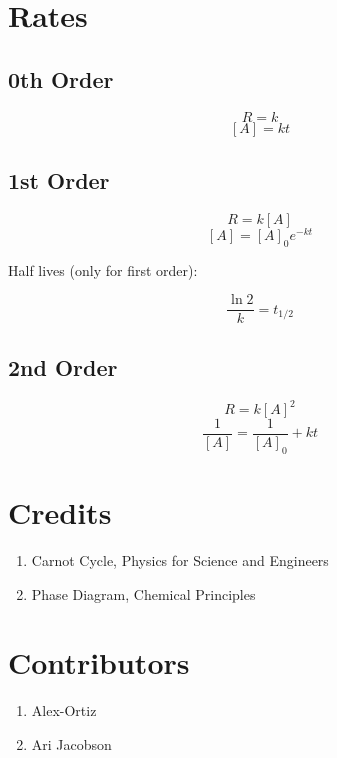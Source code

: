 \documentclass{article}
\begin{document}
\section{Rates}
\subsection{0th Order}
\[
R = k
\]
\[
[A] = kt
\]
\subsection{1st Order}
\[
R = k[A]
\]
\[
[A] = [A]_0 e^{-kt}
\]

Half lives (only for first order):

\[
\frac{\ln 2}{k} = t_{1/2}
\]

\subsection{2nd Order}
\[
R = k [A]^2
\]
\[
\frac{1}{[A]} = \frac{1}{[A]_0} +kt
\]


\section{Credits}
\begin{enumerate}
\item Carnot Cycle, Physics for Science and Engineers
\item Phase Diagram, Chemical Principles
\end{enumerate}

\section{Contributors}
\begin{enumerate}
\item Alex-Ortiz
\item Ari Jacobson

\end{enumerate}
\end{document}
